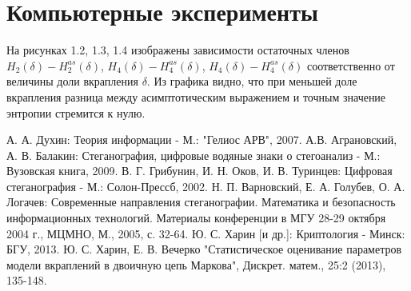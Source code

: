 \documentclass[a4paper,12pt]{article}
\theoremstyle{plain}
\begin{document}
		
\clearpage
\section{Компьютерные эксперименты}
На рисунках 1.2, 1.3, 1.4 изображены зависимости остаточных членов $H_2(\delta)-H_2^{as}(\delta)$, $H_4(\delta)-H_4^{as}(\delta)$, $H_4(\delta)-H_4^{as}(\delta)$ соответственно от величины доли вкрапления $\delta$. Из графика видно, что при меньшей доле вкрапления разница между асимптотическим выражением и точным значение энтропии стремится к нулю.

\clearpage


\begin{thebibliography}{0}
	А. А. Духин: Теория информации - М.: "Гелиос АРВ", 2007.
	А.В. Аграновский, А. В. Балакин: Стеганография, цифровые водяные знаки о стегоанализ - М.: Вузовская книга, 2009.
	 В. Г. Грибунин, И. Н. Оков, И. В. Туринцев: Цифровая стеганография - М.: Солон-Прессб, 2002.
	Н. П. Варновский, Е. А. Голубев, О. А. Логачев: Современные направления стеганографии. Математика и безопасность информационных технологий. Материалы конференции в МГУ 28-29 октября 2004 г., МЦМНО, М., 2005, с. 32-64.
	Ю. С. Харин [и др.]: Криптология - Минск: БГУ, 2013.
	Ю. С. Харин, Е. В. Вечерко "Статистическое оценивание параметров модели вкраплений в двоичную цепь Маркова", Дискрет. матем., 25:2 (2013), 135-148.
\end{thebibliography}
\end{document}
